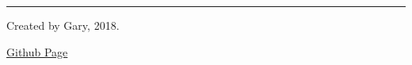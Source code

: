 \documentclass[10pt,letterpaper]{article}
\begin{document}
\begin{multicols}{3}



\rule{0.3\linewidth}{0.25pt}
\scriptsize

Created by Gary, 2018.

\href{https://github.com/garygra/ROS_cheat_sheet}{Github Page}


\end{multicols}
\end{document}
